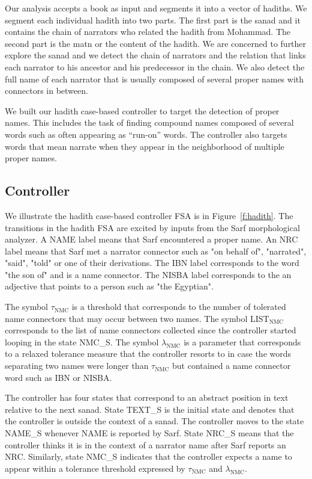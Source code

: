\documentclass[11pt,letterpaper]{article}
\begin{document}
Our analysis accepts a book as input
and segments it into a vector of hadiths. 
We segment each individual hadith into two parts. 
The first part is the sanad and it
contains the chain of narrators who related the hadith
from Mohammad. 
The second part is the matn or the content
of the hadith. 
We are concerned to further explore the sanad and
we detect the chain of narrators and 
the relation that links each narrator to his ancestor and 
his predecessor in the chain. 
We also detect the full name of each narrator that is
usually composed of several proper names with connectors
in between. 

We built our hadith case-based controller to target
the detection of proper names. 
This includes the task of finding compound names 
composed of several words such as  often
appearing as ``run-on'' words.
The controller also targets words that mean narrate when
they appear in the neighborhood of multiple proper names. 

\subsection{Controller}


We illustrate the hadith case-based controller FSA is 
in Figure~\ref{f:hadith}. 
The transitions in the hadith FSA are excited
by inputs from the Sarf morphological analyzer. 
A NAME label means that Sarf encountered a proper name.
An NRC label means that Sarf met a narrator connector such as
 "on behalf of",  "narrated",  "said", 
 "told" or one of their derivations. 
The IBN label corresponds to the word  "the son of" and is a name connector.
The NISBA label corresponds to the an adjective that points to a person such 
as  "the Egyptian". 

The symbol $\tau_{\mbox{NMC}}$ is a threshold
that corresponds to the number of tolerated name connectors 
that may occur between two names. 
The symbol LIST$_{\mbox{NMC}}$ corresponds to the list 
of name connectors collected since the controller
started looping in the state NMC\_S. 
The symbol $\lambda_{\mbox{NMC}}$ is a parameter 
that corresponds to a relaxed tolerance measure that
the controller resorts to in case the words separating
two names were longer than $\tau_{\mbox{NMC}}$ but 
contained a name connector word such as IBN or NISBA.

The controller has four states that correspond to 
an abstract position in text relative to the next sanad. 
State TEXT\_S is the initial state and denotes that
the controller is outside the context of a sanad.
The controller moves to the state NAME\_S whenever
NAME is reported by Sarf.
State NRC\_S means that the controller thinks it is in the context
of a narrator name after Sarf reports an NRC.
Similarly, state NMC\_S
indicates that the controller expects a name to appear within 
a tolerance threshold expressed by 
$\tau_{\mbox{NMC}}$ and $\lambda_{\mbox{NMC}}$.
\end{document}
